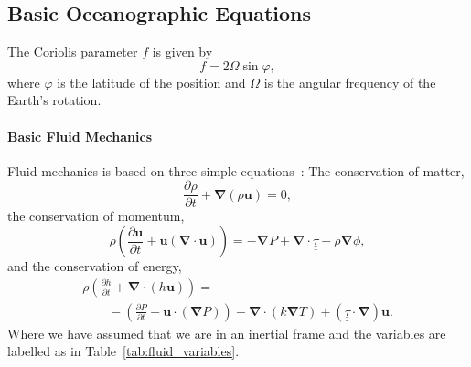 \subsection{Basic Oceanographic Equations}

The Coriolis parameter $f$ is given by
\begin{equation}
f=2 \Omega \sin \varphi,
\label{eq:coriolis}
\end{equation}
where $\varphi$ is the latitude of the position and $\Omega$ is the angular
 frequency of the Earth's rotation.

\paragraph{Basic Fluid Mechanics}
Fluid mechanics is based on three simple equations~\cite{landau1959course}:
 The conservation of matter,
\begin{equation}
\frac{\partial \rho}{\partial t} + \boldsymbol{\nabla}(\rho \boldsymbol{u}) = 0,
\tag{Matter}
\label{eq:Matter}
\end{equation}
the conservation of momentum,
\begin{equation}
\rho\left (\frac{\partial \mathbf{u}}{\partial t}
+ \mathbf{u}(\boldsymbol{\nabla}\cdot \mathbf{u})\right) =
- \boldsymbol{\nabla}P + \boldsymbol{\nabla}\cdot \underline{\underline{\tau}}
- \rho\boldsymbol{\nabla}\phi,
\tag{Momentum}
\end{equation}
and the conservation of energy,
\begin{equation}
\begin{array}{l}
\rho \left( \frac{\partial h}{\partial t} + \boldsymbol{\nabla}
\cdot (h\mathbf{u})\right) = \\ \quad\quad- \left( \frac{\partial P}{\partial t}
+ \mathbf{u}\cdot (\boldsymbol{\nabla} P) \right)
+ \boldsymbol{\nabla}\cdot (k \boldsymbol{\nabla} T )
+ (\underline{\underline{\tau}}\cdot\boldsymbol{\nabla})\mathbf{u}.\end{array}
\tag{Energy}
\end{equation}
Where we have assumed that we are in an inertial frame and the variables are
labelled as in Table~\ref{tab:fluid_variables}.



